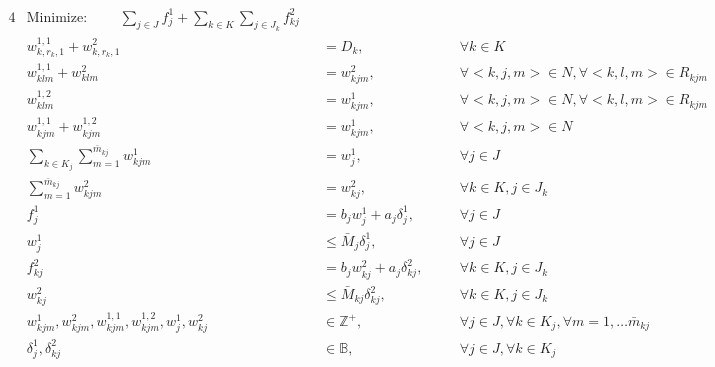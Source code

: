 \documentclass[twoside,onecolumn,12pt,letterpaper]{article}
\begin{document}
\begin{alignat}{4}
& \text{Minimize: } \qquad \sum_{j \in J} f_{j}^{1} + \sum_{k \in K} \sum_{j \in J_k} f_{kj}^{2} \label{eq:fullmodelobj} \\
& w_{k,r_k,1}^{1,1} + w_{k,r_k,1}^{2} &&  = D_k , && \quad \forall k \in K \label{eq:c1} \\
& w_{klm}^{1,1} + w_{klm}^{2} &&  = w_{kjm}^{2} , && \quad \forall {<}k,j,m{>} \in N, \forall {<}k,l,m{>} \in R_{kjm} \label{eq:c2} \\
& w_{klm}^{1,2} &&  = w_{kjm}^{1} , && \quad \forall {<}k,j,m{>} \in N, \forall {<}k,l,m{>} \in R_{kjm} \label{eq:c3} \\
& w_{kjm}^{1,1} + w_{kjm}^{1,2} &&  = w_{kjm}^{1} , && \quad \forall {<}k,j,m{>} \in N \label{eq:c4} \\
& \sum_{k \in K_j} \sum_{m=1}^{\bar{m}_{kj}} w_{kjm}^{1} &&  = w_{j}^{1} , && \quad \forall j \in J \label{eq:c5} \\
& \sum_{m=1}^{\bar{m}_{kj}} w_{kjm}^{2} &&  = w_{kj}^{2} , && \quad \forall k \in K, j \in J_k \label{eq:c6} \\
& f_{j}^{1} &&  = b_j w_{j}^{1} + a_j \delta_{j}^{1}, && \quad \forall j \in J \label{eq:c7} \\
& w_{j}^{1} &&  \leq \bar{M}_{j} \delta_{j}^{1}, && \quad \forall j \in J \label{eq:c8} \\
& f_{kj}^{2} &&  = b_j w_{kj}^{2} + a_j \delta_{kj}^{2}, && \quad \forall k \in K, j \in J_k \label{eq:c9} \\
& w_{kj}^{2} &&  \leq \bar{M}_{kj} \delta_{kj}^{2}, && \quad \forall k \in K, j \in J_k \label{eq:c10} \\
& w_{kjm}^{1},w_{kjm}^{2},w_{kjm}^{1,1},w_{kjm}^{1,2},w_{j}^{1},w_{kj}^{2} && \in \mathbb{Z}^{+}, && \quad \forall j \in J, \forall k \in K_j, \forall m=1,\ldots \bar{m}_{kj} \label{eq:cdomain1} \\
& \delta_{j}^1, \delta_{kj}^2 && \in \mathbb{B}, && \quad \forall j \in J, \forall k \in K_j \label{eq:cdomain2} 
\end{alignat}
\\
\end{document}
